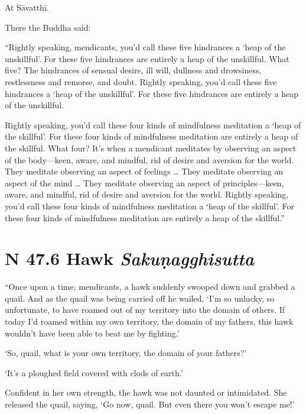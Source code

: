 \documentclass[12pt,openany]{book}%
\newcommand*{\suttatitleacronym}[1]{\smaller[2]{#1}\vspace*{.3em}}
\newcommand*{\suttatitletranslation}[1]{\linebreak{#1}}
\newcommand*{\suttatitleroot}[1]{\linebreak\smaller[2]\itshape{#1}}
\newcommand*{\tocacronym}[1]{\hspace*{-3.3em}{#1}\quad}
\newcommand*{\toctranslation}[1]{#1}
\newcommand*{\tocroot}[1]{(\textit{#1})}
\begin{document}
At \textsanskrit{Sāvatthī}. 

There the Buddha said: 

“Rightly speaking, mendicants, you’d call these five hindrances a ‘heap of the unskillful’. For these five hindrances are entirely a heap of the unskillful. What five? The hindrances of sensual desire, ill will, dullness and drowsiness, restlessness and remorse, and doubt. Rightly speaking, you’d call these five hindrances a ‘heap of the unskillful’. For these five hindrances are entirely a heap of the unskillful. 

Rightly speaking, you’d call these four kinds of mindfulness meditation a ‘heap of the skillful’. For these four kinds of mindfulness meditation are entirely a heap of the skillful. What four? It’s when a mendicant meditates by observing an aspect of the body—keen, aware, and mindful, rid of desire and aversion for the world. They meditate observing an aspect of feelings … They meditate observing an aspect of the mind … They meditate observing an aspect of principles—keen, aware, and mindful, rid of desire and aversion for the world. Rightly speaking, you’d call these four kinds of mindfulness meditation a ‘heap of the skillful’. For these four kinds of mindfulness meditation are entirely a heap of the skillful.” 

%
\section*{{\suttatitleacronym SN 47.6}{\suttatitletranslation A Hawk }{\suttatitleroot Sakuṇagghisutta}}
\addcontentsline{toc}{section}{\tocacronym{SN 47.6} \toctranslation{A Hawk } \tocroot{Sakuṇagghisutta}}

“Once upon a time, mendicants, a hawk suddenly swooped down and grabbed a quail. And as the quail was being carried off he wailed, ‘I’m so unlucky, so unfortunate, to have roamed out of my territory into the domain of others. If today I’d roamed within my own territory, the domain of my fathers, this hawk wouldn’t have been able to beat me by fighting.’ 

‘So, quail, what is your own territory, the domain of your fathers?’ 

‘It’s a ploughed field covered with clods of earth.’ 

Confident in her own strength, the hawk was not daunted or intimidated. She released the quail, saying, ‘Go now, quail. But even there you won’t escape me!’ 
\end{document}
